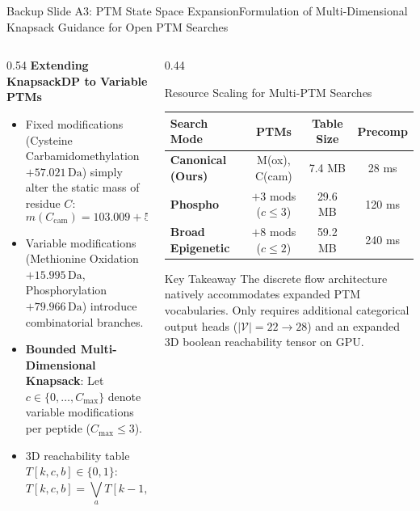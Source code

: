 \documentclass[aspectratio=169, 10pt]{beamer}
\begin{document}
\begin{frame}{Backup Slide A3: PTM State Space Expansion}{Formulation of Multi-Dimensional Knapsack Guidance for Open PTM Searches}
\scriptsize
\begin{columns}[T]
\begin{column}{0.54\textwidth}
  \textbf{\footnotesize Extending KnapsackDP to Variable PTMs}
  \begin{itemize}\setlength{\itemsep}{2pt}\tiny
    \item Fixed modifications (Cysteine Carbamidomethylation $+57.021\,\text{Da}$) simply alter the static mass of residue $C$:
    \begin{equation*}
      m(C_{\text{cam}}) = 103.009 + 57.021 = 160.030\,\text{Da}
    \end{equation*}
    \item Variable modifications (Methionine Oxidation $+15.995\,\text{Da}$, Phosphorylation $+79.966\,\text{Da}$) introduce combinatorial branches.
    \item \textbf{Bounded Multi-Dimensional Knapsack}: Let $c \in \{0, \dots, C_{\max}\}$ denote variable modifications per peptide ($C_{\max} \le 3$).
    \item 3D reachability table $T[k, c, b] \in \{0, 1\}$:
    \begin{equation*}
      T[k, c, b] = \bigvee_{a} T[k-1, c, b - w_a] \lor \bigvee_{a_{\text{ptm}}} T[k-1, c-1, b - w_{a_{\text{ptm}}}]
    \end{equation*}
  \end{itemize}
\end{column}

\begin{column}{0.44\textwidth}
  \begin{block}{\scriptsize Resource Scaling for Multi-PTM Searches}
    \begin{table}
    \centering
    \tiny
    \begin{tabular}{lccc}
      \toprule
      \textbf{Search Mode} & \textbf{PTMs} & \textbf{Table Size} & \textbf{Precomp} \\
      \midrule
      \textbf{Canonical (Ours)} & M(ox), C(cam) & 7.4 MB & 28 ms \\
      \textbf{Phospho} & $+3$ mods ($c \le 3$) & 29.6 MB & 120 ms \\
      \textbf{Broad Epigenetic} & $+8$ mods ($c \le 2$) & 59.2 MB & 240 ms \\
      \bottomrule
    \end{tabular}
    \end{table}
  \end{block}
  \vspace{0.05cm}
  \begin{exampleblock}{\scriptsize Key Takeaway}
    \tiny The discrete flow architecture natively accommodates expanded PTM vocabularies. Only requires additional categorical output heads ($|\mathcal{V}| = 22 \to 28$) and an expanded 3D boolean reachability tensor on GPU.
  \end{exampleblock}
\end{column}
\end{columns}
\end{frame}
\end{document}
